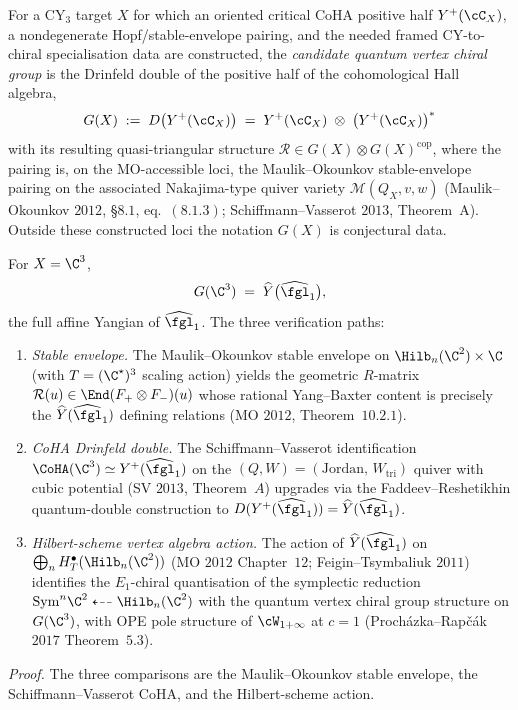 \begin{definition}
\label{def:quantum-vertex-chiral-group}
For a CY$_3$ target $X$ for which an oriented critical CoHA positive half
$Y^+(\cC_X)$, a nondegenerate Hopf/stable-envelope pairing, and the needed
framed CY-to-chiral specialisation data are constructed, the \emph{candidate
quantum vertex chiral group} is the Drinfeld double of the positive half of
the cohomological Hall algebra,
\[
 G(X) \;:=\; D\bigl(Y^+(\cC_X)\bigr)
 \;=\; Y^+(\cC_X) \;\otimes\; \bigl(Y^+(\cC_X)\bigr)^*
\]
with its resulting quasi-triangular structure
$\mathcal{R} \in G(X) \otimes G(X)^{\mathrm{cop}}$, where the pairing
is, on the MO-accessible loci, the Maulik--Okounkov stable-envelope pairing on the associated
Nakajima-type quiver variety $\mathcal{M}(Q_X, v, w)$ (Maulik--Okounkov
$2012$, \S$8.1$, eq.~$(8.1.3)$; Schiffmann--Vasserot $2013$, Theorem~A).
Outside these constructed loci the notation \(G(X)\) is conjectural data.
\end{definition}

\begin{theorem}
\label{thm:GofC3-affine-yangian}
For $X = \C^3$,
\[
 G(\C^3) \;=\; \widehat{Y}\bigl(\widehat{\fgl}_1\bigr),
\]
the full affine Yangian of $\widehat{\fgl}_1$. The three verification paths:
\begin{enumerate}
 \item \emph{Stable envelope.} The Maulik--Okounkov stable envelope on
 $\Hilb_n(\C^2) \times \C$ (with $T = (\C^\star)^3$ scaling
 action) yields the geometric $R$-matrix
 $\mathcal{R}(u) \in \End(F_+ \otimes F_-)(u)$ whose rational
 Yang--Baxter content is precisely the $\widehat{Y}(\widehat{\fgl}_1)$
 defining relations (MO $2012$, Theorem~$10.2.1$).
 \item \emph{CoHA Drinfeld double.} The Schiffmann--Vasserot
 identification $\CoHA(\C^3) \simeq Y^+(\widehat{\fgl}_1)$ on the
 $(Q,W) = (\mathrm{Jordan},\, W_{\mathrm{tri}})$ quiver with cubic
 potential (SV $2013$, Theorem~$A$) upgrades via the Faddeev--Reshetikhin
 quantum-double construction to
 $D(Y^+(\widehat{\fgl}_1)) = \widehat{Y}(\widehat{\fgl}_1)$.
 \item \emph{Hilbert-scheme vertex algebra action.} The action of
 $\widehat{Y}(\widehat{\fgl}_1)$ on
 $\bigoplus_n H^\bullet_T(\Hilb_n(\C^2))$ (MO $2012$ Chapter~$12$;
 Feigin--Tsymbaliuk $2011$) identifies the $E_1$-chiral quantisation
 of the symplectic reduction
 $\mathrm{Sym}^n\C^2 \dashleftarrow \Hilb_n(\C^2)$
 with the quantum vertex chiral group structure on $G(\C^3)$,
 with OPE pole structure of $\cW_{1+\infty}$ at $c=1$
 (Proch\'azka--Rap\v{c}\'ak $2017$ Theorem~$5.3$).
\end{enumerate}
\end{theorem}
\noindent\emph{Proof.} The three comparisons are the Maulik--Okounkov stable envelope, the Schiffmann--Vasserot CoHA, and the Hilbert-scheme action.

